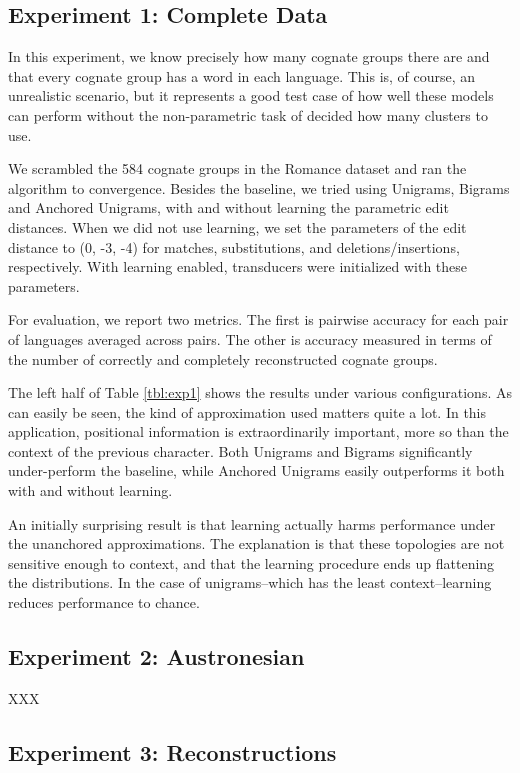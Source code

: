 \documentclass[11pt,a4paper]{article}
\begin{document}
\subsection{Experiment 1: Complete Data}

In this experiment, we know precisely how many cognate groups there
are and that every cognate group has a word in each language. This
is, of course, an unrealistic scenario, but it represents a good
test case of how well these models can perform without the
non-parametric task of decided how many clusters to use.

We scrambled the 584 cognate groups in the Romance dataset and ran
the algorithm to convergence. Besides the baseline, we tried using
Unigrams, Bigrams and Anchored Unigrams, with and without learning
the parametric edit distances. When we did not use learning, we set
the parameters of the edit distance to (0, -3, -4) for matches,
substitutions, and deletions/insertions, respectively. With learning
enabled, transducers were initialized with these parameters.

For evaluation, we report two metrics. The first is pairwise accuracy
for each pair of languages averaged across pairs. The other is
accuracy measured in terms of the number of correctly and completely
reconstructed cognate groups.

The left half of Table \ref{tbl:exp1} shows the results under various
configurations. As can easily be seen, the kind of approximation
used matters quite a lot. In this application, positional information
is extraordinarily important, more so than the context of the
previous character. Both Unigrams and Bigrams significantly
under-perform the baseline, while Anchored Unigrams easily outperforms
it both with and without learning.

An initially surprising result is that learning actually harms
performance under the unanchored approximations. The explanation
is that these topologies are not sensitive enough to context, and
that the learning procedure ends up flattening the distributions.
In the case of unigrams--which has the least context--learning
reduces performance to chance.

\subsection{Experiment 2: Austronesian}

XXX

\subsection{Experiment 3: Reconstructions}
\end{document}
